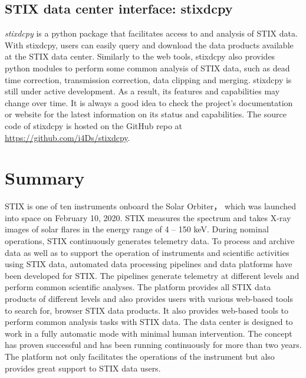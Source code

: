 \documentclass[referee]{aa} %
\begin{document}
\subsection{STIX data center interface:  stixdcpy}
{\it stixdcpy} is a python package that facilitates access to and analysis of STIX data. 
With stixdcpy, users can easily query and download the data products available at the STIX data center.
Similarly to the web tools, stixdcpy also provides python modules to perform some common analysis of STIX data, such as dead time correction, transmission correction, data clipping and merging. 
stixdcpy is still under active development. As a result, its features and 
capabilities may change over time. It is always a good idea to check the project's documentation 
or website for the latest information on its status and capabilities.
The source code of stixdcpy is hosted on the GitHub repo at \url{https://github.com/i4Ds/stixdcpy}.
\section{Summary}
\label{sec:summary}
STIX is one of ten instruments onboard the Solar Orbiter，
which was launched into space on February 10, 2020.
 STIX measures the spectrum and takes X-ray images of solar 
 flares in the energy range of 4 -- 150 keV.  
 During nominal operations, STIX continuously generates telemetry data. 
 To process and archive data as well as to support the operation of 
 instruments and scientific activities using STIX data, 
 automated data processing pipelines and data platforms have been 
 developed for STIX. The pipelines generate telemetry at different levels and perform common scientific analyses.  The platform provides 
 all STIX data products of different levels and also provides users 
 with various web-based tools to search for,  browser STIX data products. 
 It also provides web-based tools to perform common analysis tasks with STIX data. 
  The data center is designed to work in a 
 fully automatic mode with minimal human intervention. The concept has proven successful 
 and has been running continuously for more than two years.
The platform not only facilitates the operations of the instrument but also provides great support to STIX data users.





\end{document}

